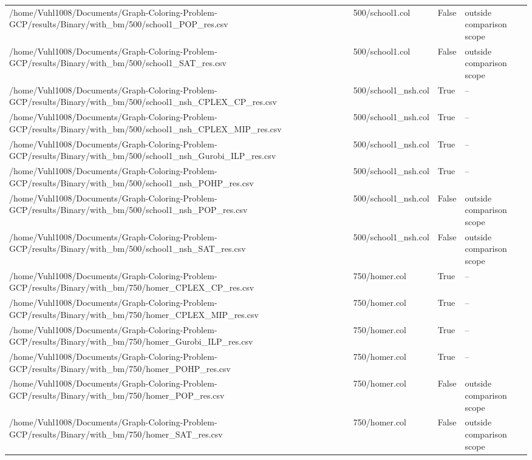 \begin{table}[htbp]
\begin{tabular}{llll}
/home/Vuhl1008/Documents/Graph-Coloring-Problem-GCP/results/Binary/with\_bm/500/school1\_POP\_res.csv & 500/school1.col & False & outside comparison scope \\
/home/Vuhl1008/Documents/Graph-Coloring-Problem-GCP/results/Binary/with\_bm/500/school1\_SAT\_res.csv & 500/school1.col & False & outside comparison scope \\
/home/Vuhl1008/Documents/Graph-Coloring-Problem-GCP/results/Binary/with\_bm/500/school1\_nsh\_CPLEX\_CP\_res.csv & 500/school1\_nsh.col & True & -- \\
/home/Vuhl1008/Documents/Graph-Coloring-Problem-GCP/results/Binary/with\_bm/500/school1\_nsh\_CPLEX\_MIP\_res.csv & 500/school1\_nsh.col & True & -- \\
/home/Vuhl1008/Documents/Graph-Coloring-Problem-GCP/results/Binary/with\_bm/500/school1\_nsh\_Gurobi\_ILP\_res.csv & 500/school1\_nsh.col & True & -- \\
/home/Vuhl1008/Documents/Graph-Coloring-Problem-GCP/results/Binary/with\_bm/500/school1\_nsh\_POHP\_res.csv & 500/school1\_nsh.col & True & -- \\
/home/Vuhl1008/Documents/Graph-Coloring-Problem-GCP/results/Binary/with\_bm/500/school1\_nsh\_POP\_res.csv & 500/school1\_nsh.col & False & outside comparison scope \\
/home/Vuhl1008/Documents/Graph-Coloring-Problem-GCP/results/Binary/with\_bm/500/school1\_nsh\_SAT\_res.csv & 500/school1\_nsh.col & False & outside comparison scope \\
/home/Vuhl1008/Documents/Graph-Coloring-Problem-GCP/results/Binary/with\_bm/750/homer\_CPLEX\_CP\_res.csv & 750/homer.col & True & -- \\
/home/Vuhl1008/Documents/Graph-Coloring-Problem-GCP/results/Binary/with\_bm/750/homer\_CPLEX\_MIP\_res.csv & 750/homer.col & True & -- \\
/home/Vuhl1008/Documents/Graph-Coloring-Problem-GCP/results/Binary/with\_bm/750/homer\_Gurobi\_ILP\_res.csv & 750/homer.col & True & -- \\
/home/Vuhl1008/Documents/Graph-Coloring-Problem-GCP/results/Binary/with\_bm/750/homer\_POHP\_res.csv & 750/homer.col & True & -- \\
/home/Vuhl1008/Documents/Graph-Coloring-Problem-GCP/results/Binary/with\_bm/750/homer\_POP\_res.csv & 750/homer.col & False & outside comparison scope \\
/home/Vuhl1008/Documents/Graph-Coloring-Problem-GCP/results/Binary/with\_bm/750/homer\_SAT\_res.csv & 750/homer.col & False & outside comparison scope \\

\end{tabular}
\end{table}
